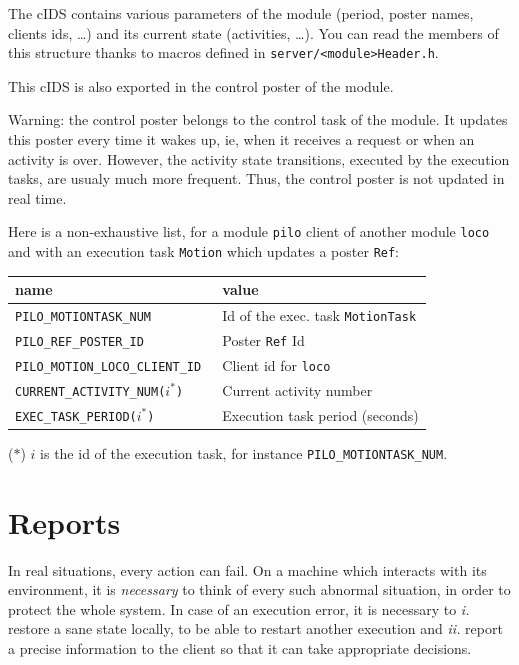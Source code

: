 The cIDS contains various parameters of the module (period, poster names,
clients ids, \ldots) and its current  state (activities, \ldots). You can
read  the members  of this  structure thanks   to macros  defined in 
\texttt{server/<module>Header.h}.

This cIDS is also exported in the control poster of the module.

Warning: the control poster belongs to the control task of the module.
It updates this poster every time it wakes up, ie, when it receives
a request or when an activity is over. However, the activity state
transitions, executed by the execution tasks, are usualy much more
frequent. Thus, the control poster is not updated in real time.


Here is a non-exhaustive list, for a module \texttt{pilo} client of another
module \texttt{loco} and with an execution task \texttt{Motion} which updates a
poster \texttt{Ref}:

\bigbreak

{\small\begin{tabularx}{0.8\linewidth}{|l|X|}
\hline
name & value\\
\hline
\tt PILO\_MOTIONTASK\_NUM    & Id of the exec. task \texttt{MotionTask}\\
\tt PILO\_REF\_POSTER\_ID    & Poster \texttt{Ref} Id\\
\tt PILO\_MOTION\_LOCO\_CLIENT\_ID & Client id for \texttt{loco}\\
\tt CURRENT\_ACTIVITY\_NUM($i^*$) & Current activity number\\
\tt EXEC\_TASK\_PERIOD($i^*$) & Execution task period (seconds)\\
\hline
\end{tabularx}}

($*$)  $i$ is   the  id  of  the    execution  task, for   instance  
\texttt{PILO\_MOTIONTASK\_NUM}.


\section{Reports}

In real situations, every action can fail. On a machine which
interacts with  its environment, it is \emph{necessary} to think of every
such abnormal situation, in order to protect the whole system. In case of
an execution error,  it  is necessary to \emph{i.} restore a sane  state
locally, to be able to restart another  execution and \emph{ii.}  report a
precise information   to the  client so  that   it can   take appropriate
decisions.


